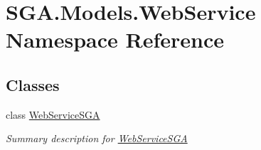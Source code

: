\hypertarget{namespace_s_g_a_1_1_models_1_1_web_service}{}\section{S\+G\+A.\+Models.\+Web\+Service Namespace Reference}
\label{namespace_s_g_a_1_1_models_1_1_web_service}
\subsection*{Classes}
\begin{DoxyCompactItemize}
\item 
class \hyperlink{class_s_g_a_1_1_models_1_1_web_service_1_1_web_service_s_g_a}{Web\+Service\+S\+GA}
\begin{DoxyCompactList}\small\item\em Summary description for \hyperlink{class_s_g_a_1_1_models_1_1_web_service_1_1_web_service_s_g_a}{Web\+Service\+S\+GA} \end{DoxyCompactList}\end{DoxyCompactItemize}
